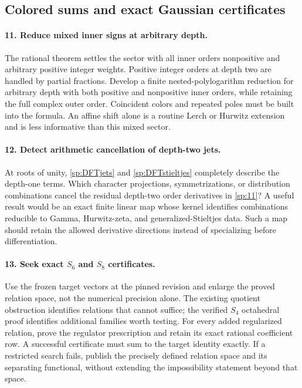 \subsection{Colored sums and exact Gaussian certificates}

\paragraph{11. Reduce mixed inner signs at arbitrary depth.}
The rational theorem settles the sector with all inner orders
nonpositive and arbitrary positive integer weights. Positive
integer orders at depth two are handled by partial fractions.
Develop a finite nested-polylogarithm reduction for arbitrary depth
with both positive and nonpositive inner orders, while retaining
the full complex outer order. Coincident colors and repeated poles
must be built into the formula. An affine shift alone is a routine
Lerch or Hurwitz extension and is less informative than this mixed
sector.

\paragraph{12. Detect arithmetic cancellation of depth-two jets.}
At roots of unity, \eqref{sp:DFTjets} and
\eqref{sp:DFTstieltjes} completely describe the depth-one terms.
Which character projections, symmetrizations, or distribution
combinations cancel the residual depth-two order derivatives in
\eqref{sp:11}? A useful result would be an exact finite linear map
whose kernel identifies combinations reducible to Gamma,
Hurwitz-zeta, and generalized-Stieltjes data. Such a map should
retain the allowed derivative directions instead of specializing
before differentiation.

\paragraph{13. Seek exact $S_6$ and $S_8$ certificates.}
Use the frozen target vectors at the pinned revision and enlarge the
proved relation space, not the numerical precision alone. The
existing quotient obstruction identifies relations that cannot
suffice; the verified $S_4$ octahedral proof identifies additional
families worth testing. For every added regularized relation,
prove the regulator prescription and retain its exact rational
coefficient row. A successful certificate must sum to the target
identity exactly. If a restricted search fails, publish the
precisely defined relation space and its separating functional,
without extending the impossibility statement beyond that space.

